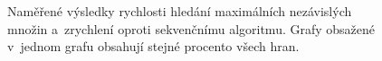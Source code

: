 \documentclass[12pt]{article}
\begin{document}
\begin{figure}[p]
    \centering
    \\
    \\
    \caption{Naměřené výsledky rychlosti hledání maximálních nezávislých množin a~zrychlení oproti sekvenčnímu algoritmu. Grafy obsažené v~jednom grafu obsahují stejné procento všech hran.} \label{fig:SpeedResults}
\end{figure}
\end{document}
